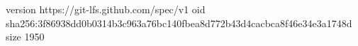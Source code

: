version https://git-lfs.github.com/spec/v1
oid sha256:3f86938dd0b0314b3c963a76bc140fbea8d772b43d4cacbca8f46e34e3a1748d
size 1950
